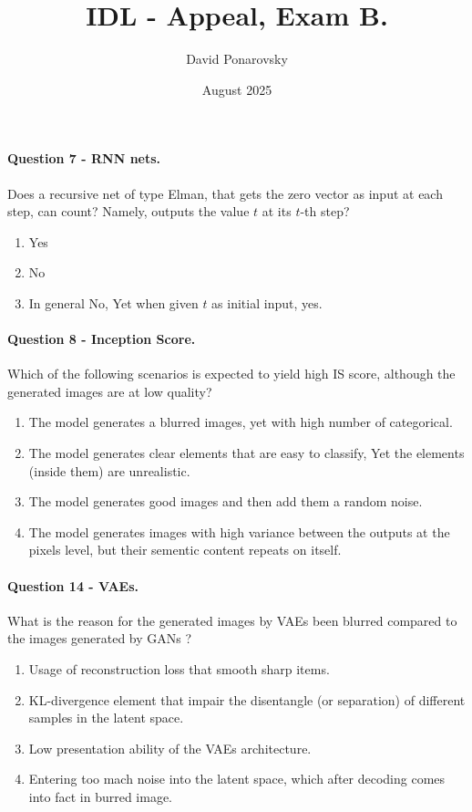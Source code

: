 \documentclass{article}
\title{IDL - Appeal, Exam B. }
\author{David Ponarovsky}
\date{August 2025}
\begin{document}
\maketitle

\paragraph{ Question 7 - RNN nets.} 
Does a recursive net of type Elman, that gets the zero vector as input at each step, can count? Namely, outputs the value $t$ at its $t$-th step?
\begin{enumerate}
  \item Yes
  \item No
  \item In general No, Yet when given $t$ as initial input, yes. 
\end{enumerate}
\paragraph{ Question 8 - Inception Score. } Which of the following scenarios is expected to yield high IS score, although the generated images are at low quality?
\begin{enumerate}
  \item The model generates a blurred images, yet with high number of categorical.  
  \item The model generates clear elements that are easy to classify, Yet the elements (inside them) are unrealistic. 
  \item The model generates good images and then add them a random noise. 
  \item The model generates images with high variance between the outputs at the pixels level, but their sementic content repeats on itself.    
\end{enumerate}
\paragraph{ Question 14 - VAEs. } What is the reason for the generated images by VAEs been blurred compared to the images generated by GANs ?   
\begin{enumerate}
  \item Usage of reconstruction loss that smooth sharp items.   
  \item  KL-divergence element that impair the disentangle (or separation) of different samples in the latent space. 
  \item Low presentation ability of the VAEs architecture. 
  \item Entering too mach noise into the latent space, which after decoding comes into fact in burred image. 

\end{enumerate}
\end{document}
